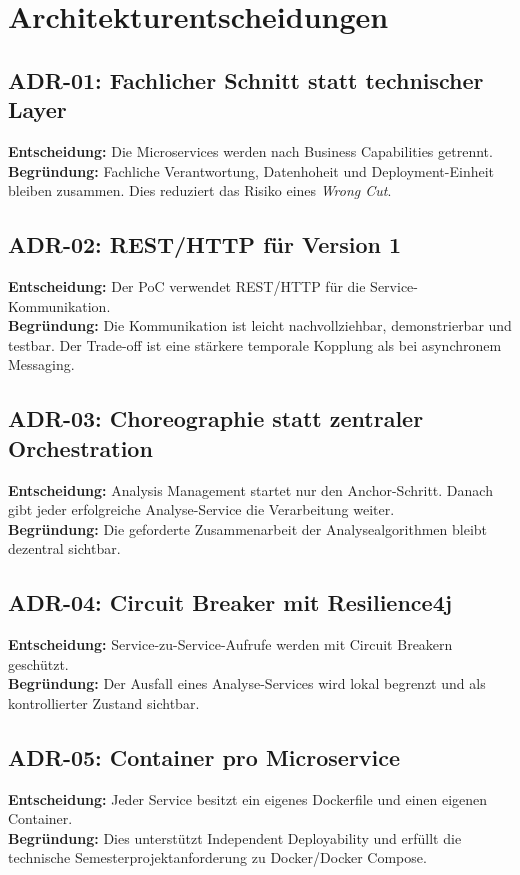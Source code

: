 \newpage

\section{Architekturentscheidungen}
\subsection{ADR-01: Fachlicher Schnitt statt technischer Layer}
\textbf{Entscheidung:} Die Microservices werden nach Business Capabilities getrennt.\\
\textbf{Begründung:} Fachliche Verantwortung, Datenhoheit und Deployment-Einheit bleiben zusammen. Dies reduziert das Risiko eines \emph{Wrong Cut}.

\subsection{ADR-02: REST/HTTP für Version 1}
\textbf{Entscheidung:} Der PoC verwendet REST/HTTP für die Service-Kommunikation.\\
\textbf{Begründung:} Die Kommunikation ist leicht nachvollziehbar, demonstrierbar und testbar. Der Trade-off ist eine stärkere temporale Kopplung als bei asynchronem Messaging.

\subsection{ADR-03: Choreographie statt zentraler Orchestration}
\textbf{Entscheidung:} Analysis Management startet nur den Anchor-Schritt. Danach gibt jeder erfolgreiche Analyse-Service die Verarbeitung weiter.\\
\textbf{Begründung:} Die geforderte Zusammenarbeit der Analysealgorithmen bleibt dezentral sichtbar.

\subsection{ADR-04: Circuit Breaker mit Resilience4j}
\textbf{Entscheidung:} Service-zu-Service-Aufrufe werden mit Circuit Breakern geschützt.\\
\textbf{Begründung:} Der Ausfall eines Analyse-Services wird lokal begrenzt und als kontrollierter Zustand sichtbar.

\subsection{ADR-05: Container pro Microservice}
\textbf{Entscheidung:} Jeder Service besitzt ein eigenes Dockerfile und einen eigenen Container.\\
\textbf{Begründung:} Dies unterstützt Independent Deployability und erfüllt die technische Semesterprojektanforderung zu Docker/Docker Compose.

